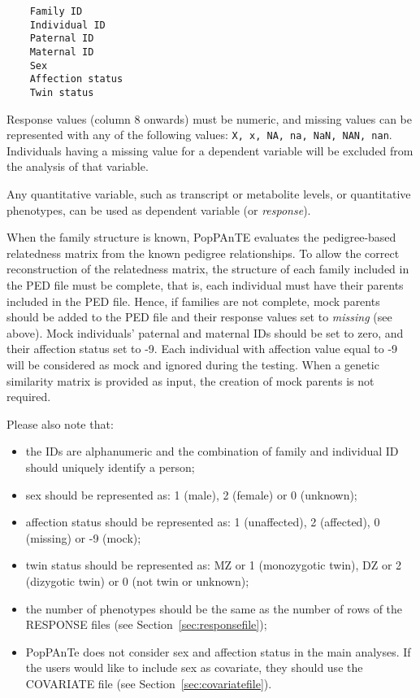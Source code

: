 \documentclass[a4paper,9pt]{article}
\newcommand{\minusitem}{\item[-]}
\begin{document}
\begin{Verbatim}
	Family ID
	Individual ID
	Paternal ID
	Maternal ID
	Sex 
	Affection status
	Twin status
\end{Verbatim}

\noindent
Response values (column 8 onwards) must be numeric, and missing values can be represented with any of the following values: \texttt{X, x, NA, na, NaN, NAN, nan}. Individuals having a missing value for a dependent variable will be excluded from the analysis of that variable.

\noindent
Any quantitative variable, such as transcript or metabolite levels, or quantitative phenotypes, can be used as dependent variable (or \emph{response}). 

\noindent
When the family structure is known, PopPAnTE evaluates the pedigree-based relatedness matrix from the known pedigree relationships. To allow the correct reconstruction of the relatedness matrix, the structure of each family included in the PED file must be complete, that is, each individual must have their parents included in the PED file. Hence, if families are not complete, mock parents should be added to the PED file and their response values set to \emph{missing} (see above). Mock individuals' paternal and maternal IDs should be set to zero, and their affection status set to -9. Each individual with affection value equal to -9 will be considered as mock and ignored during the testing.
When a genetic similarity matrix is provided as input, the creation of mock parents is not required.

\vspace{0.3cm}

\noindent
Please also note that:
\begin{itemize}
	\setlength{\itemsep}{-3pt}
	\minusitem the IDs are alphanumeric and the combination of family and individual ID should uniquely identify a person;
	\minusitem sex should be represented as: 1 (male), 2 (female) or 0 (unknown);
	\minusitem affection status should be represented as: 1 (unaffected), 2 (affected), 0 (missing) or -9 (mock);
	\minusitem twin status should be represented as: MZ or 1 (monozygotic twin), DZ or 2 (dizygotic twin) or 0 (not twin or unknown);
	\minusitem the number of phenotypes should be the same as the number of rows of the RESPONSE files (see Section~\ref{sec:responsefile});
	\minusitem PopPAnTe does not consider sex and affection status in the main analyses. If the users would like to include sex as covariate, they should use the COVARIATE file (see Section~\ref{sec:covariatefile}).
\end{itemize}
\end{document}
